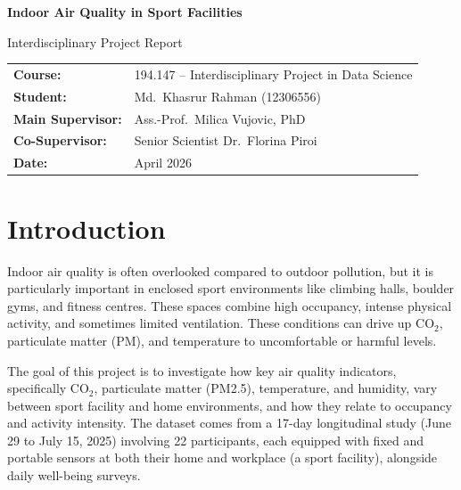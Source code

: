 \documentclass[12pt,a4paper]{article}
\begin{document}
\begin{titlepage}
    \centering
    \vspace*{2cm}
    {\Large\bfseries Indoor Air Quality in Sport Facilities\par}
    \vspace{0.4cm}
    {\large Interdisciplinary Project Report\par}
    \vspace{2cm}
    \begin{tabular}{ll}
        \textbf{Course:}          & 194.147 -- Interdisciplinary Project in Data Science \\[4pt]
        \textbf{Student:}         & Md.\ Khasrur Rahman (12306556) \\[4pt]
        \textbf{Main Supervisor:} & Ass.-Prof.\ Milica Vujovic, PhD \\[4pt]
        \textbf{Co-Supervisor:}   & Senior Scientist Dr.\ Florina Piroi \\[4pt]
        \textbf{Date:}            & April 2026 \\
    \end{tabular}
    \vfill
\end{titlepage}

\section{Introduction}

Indoor air quality is often overlooked compared to outdoor pollution, but it is particularly important in enclosed sport environments like climbing halls, boulder gyms, and fitness centres. These spaces combine high occupancy, intense physical activity, and sometimes limited ventilation. These conditions can drive up CO$_2$, particulate matter (PM), and temperature to uncomfortable or harmful levels.

The goal of this project is to investigate how key air quality indicators, specifically CO$_2$, particulate matter (PM2.5), temperature, and humidity, vary between sport facility and home environments, and how they relate to occupancy and activity intensity. The dataset comes from a 17-day longitudinal study (June 29 to July 15, 2025) involving 22 participants, each equipped with fixed and portable sensors at both their home and workplace (a sport facility), alongside daily well-being surveys.
\end{document}
